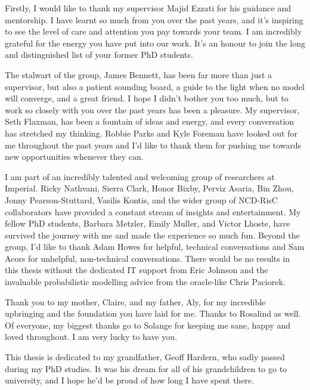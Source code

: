 
Firstly, I would like to thank my supervisor Majid Ezzati for his guidance and mentorship.
I have learnt so much from you over the past years, and it's inspiring to see the level of care and attention you pay towards your team.
I am incredibly grateful for the energy you have put into our work.
It's an honour to join the long and distinguished list of your former PhD students.

The stalwart of the group, James Bennett, has been far more than just a supervisor, but also a patient sounding board, a guide to the light when no model will converge, and a great friend.
I hope I didn't bother you too much, but to work so closely with you over the past years has been a pleasure.
My supervisor, Seth Flaxman, has been a fountain of ideas and energy, and every conversation has stretched my thinking.
Robbie Parks and Kyle Foreman have looked out for me throughout the past years and I'd like to thank them for pushing me towards new opportunities whenever they can.

I am part of an incredibly talented and welcoming group of researchers at Imperial.
Ricky Nathvani, Sierra Clark, Honor Bixby, Perviz Asaria, Bin Zhou, Jonny Pearson-Stuttard, Vasilis Kontis, and the wider group of NCD-RisC collaborators have provided a constant stream of insights and entertainment.
My fellow PhD students, Barbara Metzler, Emily Muller, and Victor Lhoste, have survived the journey with me and made the experience so much fun.
Beyond the group, I'd like to thank Adam Howes for helpful, technical conversations and Sam Acors for unhelpful, non-technical conversations.
There would be no results in this thesis without the dedicated IT support from Eric Johnson and the invaluable probabilistic modelling advice from the oracle-like Chris Paciorek.

Thank you to my mother, Claire, and my father, Aly, for my incredible upbringing and the foundation you have laid for me.
Thanks to Rosalind as well.
Of everyone, my biggest thanks go to Solange for keeping me sane, happy and loved throughout.
I am very lucky to have you.

This thesis is dedicated to my grandfather, Geoff Hardern, who sadly passed during my PhD studies.
It was his dream for all of his grandchildren to go to university, and I hope he'd be proud of how long I have spent there.